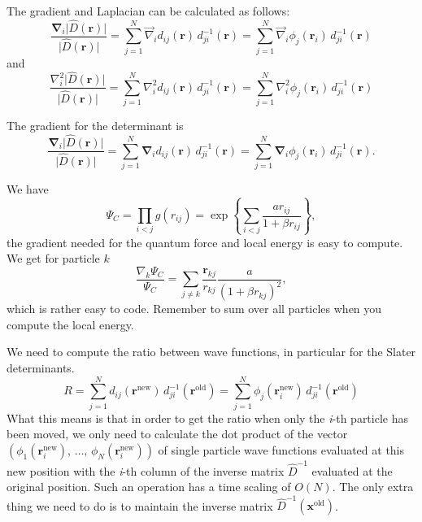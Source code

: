 The gradient and
Laplacian can be calculated as follows:
\[
\frac{\mathbf{\nabla}_i\vert\hat{D}(\mathbf{r})\vert}
{\vert\hat{D}(\mathbf{r})\vert} =
\sum_{j=1}^N \vec\nabla_i d_{ij}(\mathbf{r})\,
d_{ji}^{-1}(\mathbf{r}) =
\sum_{j=1}^N \vec\nabla_i \phi_j(\mathbf{r}_i)\,
d_{ji}^{-1}(\mathbf{r})
\]
and
\[
\frac{\nabla^2_i\vert\hat{D}(\mathbf{r})\vert}
{\vert\hat{D}(\mathbf{r})\vert} =
\sum_{j=1}^N \nabla^2_i d_{ij}(\mathbf{r})\,
d_{ji}^{-1}(\mathbf{r}) =
\sum_{j=1}^N \nabla^2_i \phi_j(\mathbf{r}_i)\,
d_{ji}^{-1}(\mathbf{r})
\]

The gradient for the determinant is 
\[
\frac{\mathbf{\nabla}_i\vert\hat{D}(\mathbf{r})\vert}
{\vert\hat{D}(\mathbf{r})\vert} =
\sum_{j=1}^N \mathbf{\nabla}_i d_{ij}(\mathbf{r})\,
d_{ji}^{-1}(\mathbf{r}) =
\sum_{j=1}^N \mathbf{\nabla}_i \phi_j(\mathbf{r}_i)\,
d_{ji}^{-1}(\mathbf{r}).
\]

We have
\[
\Psi_C=\prod_{i< j}g(r_{ij})= \exp{\left\{\sum_{i<j}\frac{ar_{ij}}{1+\beta r_{ij}}\right\}},
\]
the gradient needed for the quantum force and local energy is easy to compute.  
We get for particle  $k$
\[
\frac{ \nabla_k \Psi_C}{ \Psi_C }= \sum_{j\ne k}\frac{\mathbf{r}_{kj}}{r_{kj}}\frac{a}{(1+\beta r_{kj})^2},
\]
which is rather easy to code.  Remember to sum over all particles  when you compute the local energy.

We need to compute the ratio between wave functions, in particular  for the Slater determinants.
\[
R =\sum_{j=1}^N d_{ij}(\mathbf{r}^{\mathrm{new}})\,
d_{ji}^{-1}(\mathbf{r}^{\mathrm{old}}) = 
\sum_{j=1}^N \phi_j(\mathbf{r}_i^{\mathrm{new}})\,
d_{ji}^{-1}(\mathbf{r}^{\mathrm{old}})
\]
What this means is that in order to get the ratio when only the \emph{i}-th
particle  has been moved, we only need to calculate the dot
product of the vector $\left(\phi_1(\mathbf{r}_i^\mathrm{new}),\,\dots,\,
\phi_N(\mathbf{r}_i^\mathrm{new})\right)$ of single particle  wave functions
evaluated at this new position with the \emph{i}-th column of the inverse
matrix $\hat{D}^{-1}$ evaluated at the original position. Such
an operation has a time scaling of $O(N)$. The only extra thing we
need to do is to maintain the inverse matrix 
$\hat{D}^{-1}(\mathbf{x}^{\mathrm{old}})$.

